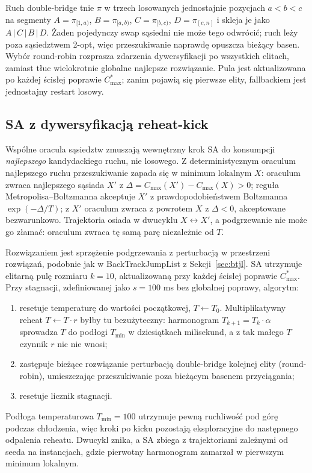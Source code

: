 \documentclass[11pt,a4paper]{article}
\begin{document}
Ruch double-bridge tnie $\pi$ w trzech losowanych jednostajnie
pozycjach $a<b<c$ na segmenty $A=\pi_{[1,a)}$, $B=\pi_{[a,b)}$,
$C=\pi_{[b,c)}$, $D=\pi_{[c,n]}$ i skleja je jako $A\,|\,C\,|\,B\,|\,D$.
Żaden pojedynczy swap sąsiedni nie może tego odwrócić; ruch leży poza
sąsiedztwem 2-opt, więc przeszukiwanie naprawdę opuszcza bieżący basen.
Wybór round-robin rozprasza zdarzenia dywersyfikacji po wszystkich
elitach, zamiast tłuc wielokrotnie globalne najlepsze rozwiązanie.
Pula jest aktualizowana po każdej ścisłej poprawie $C_{\max}^*$; zanim
pojawią się pierwsze elity, fallbackiem jest jednostajny restart losowy.

\subsection{SA z dywersyfikacją reheat-kick}
\label{sec:sa-kick}

Wspólne oracula sąsiedztw zmuszają wewnętrzny krok SA do konsumpcji
\emph{najlepszego} kandydackiego ruchu, nie losowego.
Z deterministycznym oraculum najlepszego ruchu przeszukiwanie zapada
się w minimum lokalnym $X$: oraculum zwraca najlepszego sąsiada $X'$
z $\Delta=C_{\max}(X')-C_{\max}(X)>0$; reguła Metropolisa--Boltzmanna akceptuje $X'$
z prawdopodobieństwem Boltzmanna $\exp(-\Delta/T)$; z $X'$ oraculum zwraca
z powrotem $X$ z $\Delta<0$, akceptowane bezwarunkowo. Trajektoria
osiada w dwucyklu $X\leftrightarrow X'$, a podgrzewanie nie może go
złamać: oraculum zwraca tę samą parę niezależnie od $T$.

Rozwiązaniem jest sprzężenie podgrzewania z perturbacją w przestrzeni
rozwiązań, podobnie jak w BackTrackJumpList
z Sekcji~\ref{sec:btjl}. SA utrzymuje elitarną pulę rozmiaru $k=10$,
aktualizowaną przy każdej ścisłej poprawie $C_{\max}^*$. Przy
stagnacji, zdefiniowanej jako $s=100$ ms bez globalnej poprawy,
algorytm:
\begin{enumerate}[leftmargin=1.2cm]
  \item resetuje temperaturę do wartości początkowej,
        $T\leftarrow T_0$. Multiplikatywny reheat $T\leftarrow T\cdot r$
        byłby tu bezużyteczny: harmonogram $T_{k+1}=T_k\cdot\alpha$
        sprowadza $T$ do podłogi $T_{\min}$ w dziesiątkach milisekund,
        a z tak małego $T$ czynnik $r$ nic nie wnosi;
  \item zastępuje bieżące rozwiązanie perturbacją double-bridge
        kolejnej elity (round-robin), umieszczając przeszukiwanie poza
        bieżącym basenem przyciągania;
  \item resetuje licznik stagnacji.
\end{enumerate}
Podłoga temperaturowa $T_{\min}=100$ utrzymuje pewną ruchliwość pod
górę podczas chłodzenia, więc kroki po kicku pozostają eksploracyjne do
następnego odpalenia reheatu. Dwucykl znika, a SA zbiega
z trajektoriami zależnymi od seeda na instancjach, gdzie pierwotny
harmonogram zamarzał w pierwszym minimum lokalnym.
\end{document}
